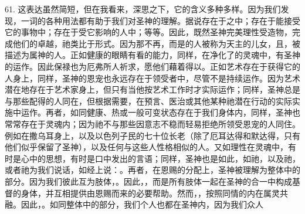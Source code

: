 61. 这表达虽然简短，但在我看来，深思之下，它的含义多种多样。因为我们发现，一词的各种用法都有助于我们对圣神的理解。据说存在于之中；存在于能接受它的事物中；存在于受它影响的人中；等等。因此，既然圣神完美理性受造物，完成他们的卓越，祂类比于形式。因为那不再，而是的人被称为天主的儿女，且，被描述为属神的人。正如健康的眼睛有看的能力，同样，在净化了的灵魂中，有圣神的运作。因此保禄也为厄弗所人祈求，愿他们藉着得以。正如艺术存在于获得它的人身上，同样，圣神的恩宠也永远存在于领受者中，尽管不是持续运作。因为艺术潜在地存在于艺术家身上，但只有当他按艺术工作时才实际运作；同样，圣神总是与那些配得的人同在，但根据需要，在预言、医治或其他某种祂潜在行动的实际实施中运作。再者，如同健康、热或一般可变状态存在于我们身体内，同样，圣神也常常存在于灵魂内；因为祂不与那些因意志不稳而轻易拒绝所领受恩宠的人同住。例如在撒乌耳身上，以及以色列子民的七十位长老（除了厄耳达得和默达得，只有他们似乎保留了圣神），以及任何与这些人性格相似的人。又如理性在灵魂中，有时是心中的思想，有时是口中发出的言语；同样，圣神也是如此，如祂，以及祂，或者祂为我们说话，如经上说：。再者，在恩赐的分配上，圣神被理解为整体中的部分。因为我们彼此互为肢体，。因此，，而是所有肢体一起在圣神的合一中构成基督的身体，并互相提供由恩赐而来的必要帮助。然而，，按照同情的内在属灵共融。因此，。如同整体中的部分，我们个人也都在圣神内，因为我们众人\par

